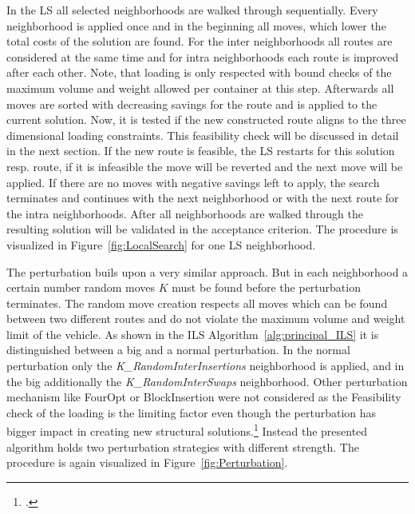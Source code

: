 In the \gls{LS} all selected neighborhoods are walked through sequentially. Every neighborhood is applied once and in the beginning
all moves, which lower the total costs of the solution are found. For the inter neighborhoods all routes are considered at the same
time and for intra neighborhoods each route is improved after each other.
Note, that loading is only respected with bound checks of the maximum volume and weight allowed per container at this step.
Afterwards all moves are sorted with decreasing savings for the route and is applied to the current solution. Now, it is tested
if the new constructed route aligns to the three dimensional loading constraints. This feasibility check will be discussed in
detail in the next section. If the new route is feasible, the \gls{LS} restarts for this solution resp. route, if it is infeasible
the move will be reverted and the next move will be applied. If there are no moves with negative savings left to apply, the search
terminates and continues with the next neighborhood or with the next route for the intra neighborhoods. After all neighborhoods
are walked through the resulting solution will be validated in the acceptance criterion. The procedure is visualized
in Figure~\ref{fig:LocalSearch} for one \gls{LS} neighborhood.


The perturbation buils upon a very similar approach. But in each neighborhood a certain number random moves $K$ must be found
before the perturbation terminates. The random move creation respects all moves which can be found between two different routes
and do not violate the maximum volume and weight limit of the vehicle. As shown in the \gls{ILS} Algorithm~\ref{alg:principal_ILS}
it is distinguished between a big and a normal perturbation. In the normal perturbation only the \textit{K\_RandomInterInsertions}
neighborhood is applied, and in the big additionally the \textit{K\_RandomInterSwaps} neighborhood. Other perturbation mechanism
like FourOpt or BlockInsertion were not considered as the Feasibility check of the loading is the limiting factor even though
the perturbation has bigger impact in creating new structural solutions.\footcite[cf.][pp. 329-332]{lourenco_iterated_2003}
Instead the presented algorithm holds two perturbation strategies with different strength.
The procedure is again visualized in Figure~\ref{fig:Perturbation}.



